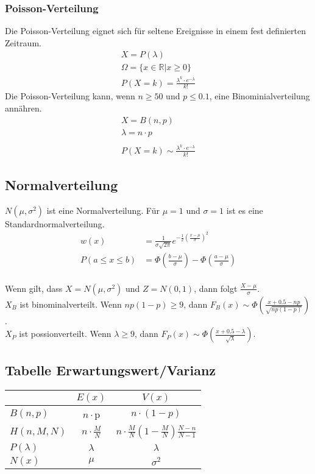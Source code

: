 \documentclass[a4paper, landscape, 10pt]{article}
\begin{document}
\begin{multicols}{4}
\begin{small}
		    \subsubsection{Poisson-Verteilung}
		    Die Poisson-Verteilung eignet sich für seltene Ereignisse in einem fest definierten Zeitraum.
			    \begin{align*}
			    X = P(\lambda)\\
			    \Omega = \{x \in \mathbb{R} | x \geq 0\}\\
			    P(X = k) = \frac{\lambda^k \cdot e^{-\lambda}}{k!}	
			    \end{align*}
		    Die Poisson-Verteilung kann, wenn $n \ge 50$ und $p \leq 0.1$, eine Binominialverteilung annähren.
			    \begin{align*}
			    X = B(n, p) \\
			    \lambda = n \cdot p \\\\
			    P(X = k) \sim \frac{\lambda^k \cdot e^{-\lambda}}{k!}	
			    \end{align*}
	    	\subsection{Normalverteilung}
	    	$N(\mu, \sigma^2)$ ist eine Normalverteilung. Für $\mu = 1$ und $\sigma = 1$ ist es eine Standardnormalverteilung.
	    	\begin{align*}
	    		w(x) &= \frac{1}{\sigma \sqrt{2 \pi}} e^{-\frac{1}{2}(\frac{x-\mu}{\sigma})^2}\\
	    		P(a\le x\le b)&= \Phi(\frac{b-\mu}{\sigma})-\Phi(\frac{a-\mu}{\sigma})
	    	\end{align*}
	    	\\
	    	
	    	Wenn gilt, dass $X = N(\mu, \sigma^2)$ und $Z = N(0,1)$, dann folgt $\frac{X - \mu}{\sigma}$. \\
	    	$X_B$ ist binominalverteilt. Wenn $np(1-p)\ge9$, dann $F_B(x) \sim \Phi\left(\frac{x + 0.5 - np}{\sqrt{np(1-p)}}\right)$. \\
	    	$X_P$ ist possionverteilt. Wenn $\lambda \ge 9$, dann $F_P(x) \sim \Phi\left(\frac{x + 0.5 - \lambda}{\sqrt{\lambda}}\right)$.
	    	
	    	\subsection{Tabelle Erwartungswert/Varianz}
	    	\begin{tabular}{l|c|c}
	    		&  $E(x)$ & $V(x)$\\ \hline
	    		$B(n,p)$ & $n\cdot$p & $n\cdotp(1-p)$\\ \hline
	    		$H(n,M,N)$ & $n\cdot\frac{M}{N}$ & $n\cdot\frac{M}{N}(1-\frac{M}{N})\frac{N-n}{N-1}$\\ \hline
	    		$P(\lambda)$ & $\lambda$ & $\lambda$\\
		    	\hline
	    		$N(x)$ & $\mu$ & $\sigma^2$
	    	\end{tabular}
	    	

\end{small}
\end{multicols}
\end{document}
